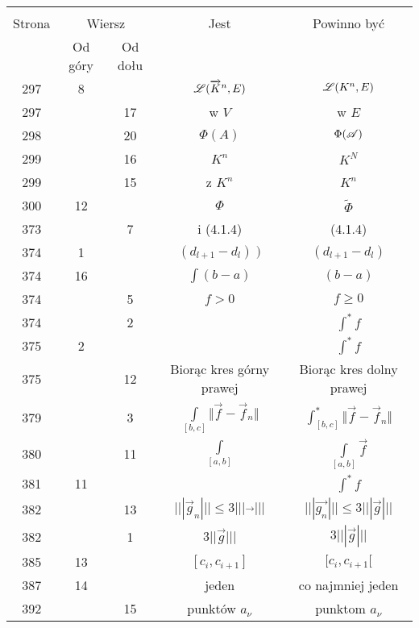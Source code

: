 \documentclass[a4paper,11pt]{article}
\begin{document}
\begin{center}

  \begin{tabular}{|c|c|c|c|c|}
    \hline
    & \multicolumn{2}{c|}{} & & \\
    Strona & \multicolumn{2}{c|}{Wiersz} & Jest
                              & Powinno być \\ \cline{2-3}
    & Od góry & Od dołu & & \\
    \hline
    297 &  8 & & $\mathcal{L}( \overrightarrow{ K }^{ n }, E )$
           & $\mathcal{L}( K^{ n }, E )$ \\
    297 & & 17 & w $V$ & w $E$ \\
    298 & & 20 & $\Phi( A )$ & $\Phi( \mathcal{A} )$ \\
    299 & & 16 & $K^{ n }$ & $K^{ N }$ \\
    299 & & 15 & z $K^{ n }$ & $K^{ n }$ \\
    300 & 12 & & $\Phi$ & $\tilde{ \Phi }$ \\
    373 & &  7 & i (4.1.4) & (4.1.4) \\
    374 &  1 & & $( d_{ l + 1 } - d_{ l } )\; )$
           & $( d_{ l + 1 } - d_{ l } )$ \\
    374 & 16 & & $\int ( b - a )$ & $( b - a )$ \\
    374 & &  5 & $f > 0$ & $f \geq 0$ \\
    374 & &  2 & & $\int^{ * } \! f$ \\
    375 &  2 & & & $\int^{ * } \! f$ \\
    375 & & 12 & Biorąc kres górny prawej & Biorąc kres dolny prawej \\
    379 & &  3 & $\int\limits_{ [ b, c ]  } \Vert \vec{ f } - \vec{ f }_{ n } \Vert$
           & $\int^{ * }_{ [ b, c ]  } \Vert \vec{ f } - \vec{ f }_{ n } \Vert$ \\
    380 & & 11 & $\int\limits_{ [ a, b ] }$
           & $\int\limits_{ [ a, b ] } \vec{ f } $ \\
    381 & 11 & & & $\int^{ * } \! f$ \\
    382 & & 13 & $||| \vec g_{ n } ||| \leq 3 ||| \vec{ \; \; } |||$
           & $||| \vec{ g_{ n } } ||| \leq 3 ||| \vec{ g } |||$ \\
    382 & &  1 & $3 || \vec{ g } |||$ & $3 ||| \vec{ g } |||$ \\
    385 & 13 & & $[ c_{ i }, c_{ i + 1 } ]$ & $[ c_{ i }, c_{ i + 1 } [$ \\
    387 & 14 & & jeden & co najmniej jeden \\
    392 & & 15 & punktów $a_{ \nu }$ & punktom $a_{ \nu }$ \\
    \hline
  \end{tabular}

\end{center}
\end{document}
